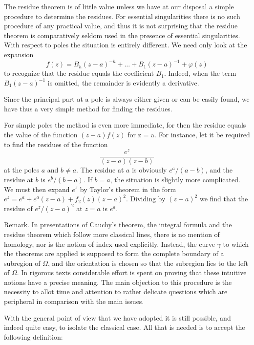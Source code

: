 The residue theorem is of little value unless we have at our disposal a simple procedure to determine the residues. For essential singularities there is no such procedure of any practical value, and thus it is not surprising that the residue theorem is comparatively seldom used in the presence of essential singularities. With respect to poles the situation is entirely different. We need only look at the expansion
\begin{equation*}
f (z) = B _ {h} (z - a) ^ {- h} + \dots + B _ {1} (z - a) ^ {- 1} + \varphi (z)
\end{equation*}
to recognize that the residue equals the coefficient $B_{1}$. Indeed, when the term $B_{1}(z - a)^{-1}$ is omitted, the remainder is evidently a derivative.


Since the principal part at a pole is always either given or can be easily found, we have thus a very simple method for finding the residues.

For simple poles the method is even more immediate, for then the residue equals the value of the function $(z - a)f(z)$ for z = a. For instance, let it be required to find the residues of the function
\begin{equation*}
\frac {e ^ {z}}{(z - a) (z - b)}
\end{equation*}
at the poles $a$ and $b \neq a$. The residue at $a$ is obviously $e^a / (a - b)$, and the residue at $b$ is $e^b / (b - a)$. If $b = a$, the situation is slightly more complicated. We must then expand $e^z$ by Taylor's theorem in the form $e^z = e^a + e^a (z - a) + f_2(z)(z - a)^2$. Dividing by $(z - a)^2$ we find that the residue of $e^z / (z - a)^2$ at $z = a$ is $e^a$.

Remark. In presentations of Cauchy's theorem, the integral formula and the residue theorem which follow more classical lines, there is no mention of homology, nor is the notion of index used explicitly. Instead, the curve $\gamma$ to which the theorems are applied is supposed to form the complete boundary of a subregion of $\Omega$, and the orientation is chosen so that the subregion lies to the left of $\Omega$. In rigorous texts considerable effort is spent on proving that these intuitive notions have a precise meaning. The main objection to this procedure is the necessity to allot time and attention to rather delicate questions which are peripheral in comparison with the main issues.

With the general point of view that we have adopted it is still possible, and indeed quite easy, to isolate the classical case. All that is needed is to accept the following definition:

